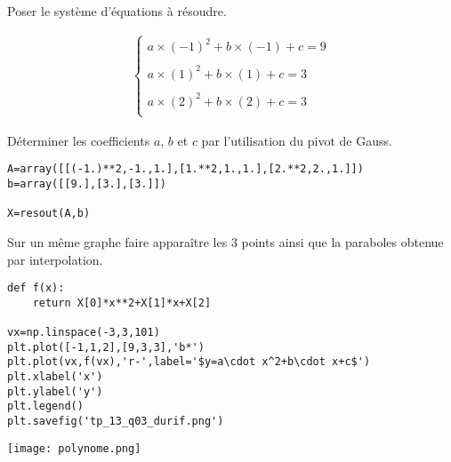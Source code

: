 \question{} Poser le système d'équations à résoudre.

\begin{align*}
\left\{
\begin{array}{l}
a\times(-1)^2+b\times (-1)+c=9\\
\\
a\times(1)^2+b\times (1)+c=3\\
\\
a\times(2)^2+b\times (2)+c=3\\
\end{array}
\right.
\end{align*}

\question{} Déterminer les coefficients $a$, $b$ et $c$ par l'utilisation du pivot de Gauss.

\begin{lstlisting}
A=array([[(-1.)**2,-1.,1.],[1.**2,1.,1.],[2.**2,2.,1.]])
b=array([[9.],[3.],[3.]])

X=resout(A,b)
\end{lstlisting}

\question{} Sur un même graphe faire apparaître les 3 points ainsi que la paraboles obtenue par interpolation.
\begin{lstlisting}
def f(x):
    return X[0]*x**2+X[1]*x+X[2]

vx=np.linspace(-3,3,101)
plt.plot([-1,1,2],[9,3,3],'b*')
plt.plot(vx,f(vx),'r-',label='$y=a\cdot x^2+b\cdot x+c$')
plt.xlabel('x')
plt.ylabel('y')
plt.legend()
plt.savefig('tp_13_q03_durif.png')
\end{lstlisting}

\begin{center}
\texttt{[image: polynome.png]}
\end{center}